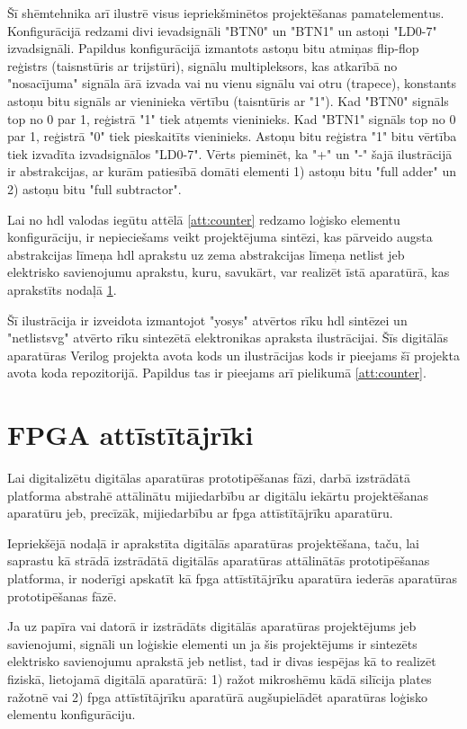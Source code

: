 Šī shēmtehnika arī ilustrē visus iepriekšminētos projektēšanas pamatelementus.
Konfigurācijā redzami divi ievadsignāli "BTN0" un "BTN1" un astoņi "LD{0-7}"
izvadsignāli. Papildus konfigurācijā izmantots astoņu bitu atmiņas flip-flop
reģistrs (taisnstūris ar trijstūri), signālu multipleksors, kas atkarībā no
"nosacījuma" signāla ārā izvada vai nu vienu signālu vai otru (trapece),
konstants astoņu bitu signāls ar vieninieka vērtību (taisntūris ar "1"). Kad
"BTN0" signāls top no 0 par 1, reģistrā "1" tiek atņemts vieninieks. Kad "BTN1"
signāls top no 0 par 1, reģistrā "0" tiek pieskaitīts vieninieks. Astoņu bitu
reģistra "1" bitu vērtība tiek izvadīta izvadsignālos "LD{0-7}". Vērts pieminēt,
ka "+" un "-" šajā ilustrācijā ir abstrakcijas, ar kurām patiesībā domāti
elementi 1) astoņu bitu "full adder" un 2) astoņu bitu "full subtractor".

Lai no \gls{hdl} valodas iegūtu attēlā \ref{att:counter} redzamo loģisko
elementu konfigurāciju, ir nepieciešams veikt projektējuma sintēzi, kas pārveido
augsta abstrakcijas līmeņa \gls{hdl} aprakstu uz zema abstrakcijas līmeņa
\gls{netlist} jeb elektrisko savienojumu aprakstu, kuru, savukārt, var realizēt
īstā aparatūrā, kas aprakstīts nodaļā \ref{sec:fpgaboard}.

Šī ilustrācija ir izveidota izmantojot "yosys" atvērtos rīku \gls{hdl} sintēzei
un "netlistsvg" atvērto rīku sintezētā elektronikas apraksta ilustrācijai. Šīs
digitālās aparatūras Verilog projekta avota kods un ilustrācijas kods ir
pieejams šī projekta avota koda repozitorijā. \cite{VeinbahsKrisjanisTestbed}
Papildus tas ir pieejams arī pielikumā \ref{att:counter}.

\section{FPGA attīstītājrīki}
\label{sec:fpgaboard}

Lai digitalizētu digitālas aparatūras prototipēšanas fāzi, darbā izstrādātā
platforma abstrahē attālinātu mijiedarbību ar digitālu iekārtu projektēšanas
aparatūru jeb, precīzāk, mijiedarbību ar \gls{fpga} attīstītājrīku aparatūru.

Iepriekšējā nodaļā ir aprakstīta digitālās aparatūras projektēšana, taču, lai
saprastu kā strādā izstrādātā digitālās aparatūras attālinātās prototipēšanas
platforma, ir noderīgi apskatīt kā \gls{fpga} attīstītājrīku aparatūra iederās
aparatūras prototipēšanas fāzē.

Ja uz papīra vai datorā ir izstrādāts digitālās aparatūras projektējums jeb
savienojumi, signāli un loģiskie elementi un ja šis projektējums ir sintezēts
elektrisko savienojumu aprakstā jeb \gls{netlist}, tad ir divas iespējas kā to
realizēt fiziskā, lietojamā digitālā aparatūrā: 1) ražot mikroshēmu kādā
silīcija plates ražotnē \cite{WikiFabs} vai 2) \gls{fpga} attīstītājrīku
aparatūrā augšupielādēt aparatūras loģisko elementu konfigurāciju.

